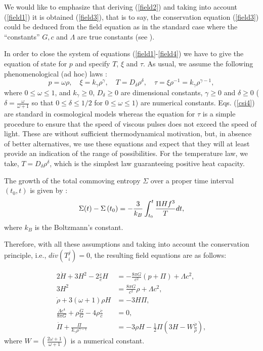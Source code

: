 \documentclass{revtex4}
\begin{document}
We would like to emphasize that deriving (\ref{field2}) and taking into
account (\ref{field1}) it is obtained (\ref{field3}), that is to say, the
conservation equation (\ref{field3}) could be deduced from the field
equation as in the standard case where the ``constants'' $G,c$ and $\Lambda $
are true constants (see \cite{Tony1}).

In order to close the system of equations (\ref{field1}-\ref{field4}) we
have to give the equation of state for $p$ and specify $T$, $\xi $ and $\tau
$. As usual, we assume the following phenomenological (ad hoc) laws \cite
{Ma95}:
\begin{equation}
p=\omega \rho ,\quad \xi =k_{\gamma }\rho ^{\gamma },\quad T=D_{\delta }\rho
^{\delta },\quad \tau =\xi \rho ^{-1}=k_{\gamma }\rho ^{\gamma -1},
\label{csi4}
\end{equation}
where $0\leq \omega \leq 1$, and $k_{\gamma }\geq 0$, $D_{\delta }\geq 0$
are dimensional constants, $\gamma \geq 0$ and $\delta \geq 0$ ($\delta =%
\frac{\omega }{\omega +1}$ so that $0\leq \delta \leq 1/2$ for $0\leq \omega
\leq 1$) are numerical constants. Eqs. (\ref{csi4}) are standard in
cosmological models whereas the equation for $\tau $ is a simple procedure
to ensure that the speed of viscous pulses does not exceed the speed of
light. These are without sufficient thermodynamical motivation, but, in
absence of better alternatives, we use these equations and expect that they
will at least provide an indication of the range of possibilities. For the
temperature law, we take, $T=D_{\delta }\rho ^{\delta }$, which is the
simplest law guaranteeing positive heat capacity.

The growth of the total commoving entropy $\Sigma $ over a proper time
interval $\left( t_{0},t\right) $ is given by \cite{Ma95}:
\begin{equation}
\Sigma (t)-\Sigma \left( t_{0}\right) =-\frac{3}{k_{B}}\int_{t_{0}}^{t}\frac{%
\Pi Hf^{3}}{T}dt,  \label{M entropy}
\end{equation}
where $k_{B}$ is the Boltzmann's constant.

Therefore, with all these assumptions and taking into account the
conservation principle, i.e., $div(T_{i}^{j})=0$, the resulting field
equations are as follows:

\begin{align}
2\dot{H}+3H^{2}-2\frac{\dot{c}}{c}H& =-\frac{8\pi G}{c^{2}}\left( p+\Pi
\right) +\Lambda c^{2},  \label{nfield1} \\
3H^{2}& =\frac{8\pi G}{c^{2}}\rho +\Lambda c^{2},  \label{nfield2} \\
\dot{\rho}+3\left( \omega +1\right) \rho H& =-3H\Pi ,  \label{nfield3} \\
\frac{\dot{\Lambda}c^{4}}{8\pi G}+\rho \frac{\dot{G}}{G}-4\rho \frac{\dot{c}%
}{c}& =0,  \label{nfield4} \\
\dot{\Pi}+\frac{\Pi }{k_{\gamma }\rho ^{\gamma -1}}& =-3\rho H-\frac{1}{2}%
\Pi \left( 3H-W\frac{\dot{\rho}}{\rho }\right) ,  \label{nfield5}
\end{align}
where $W=\left( \frac{2\omega +1}{\omega +1}\right) $ is a numerical
constant.
\end{document}
